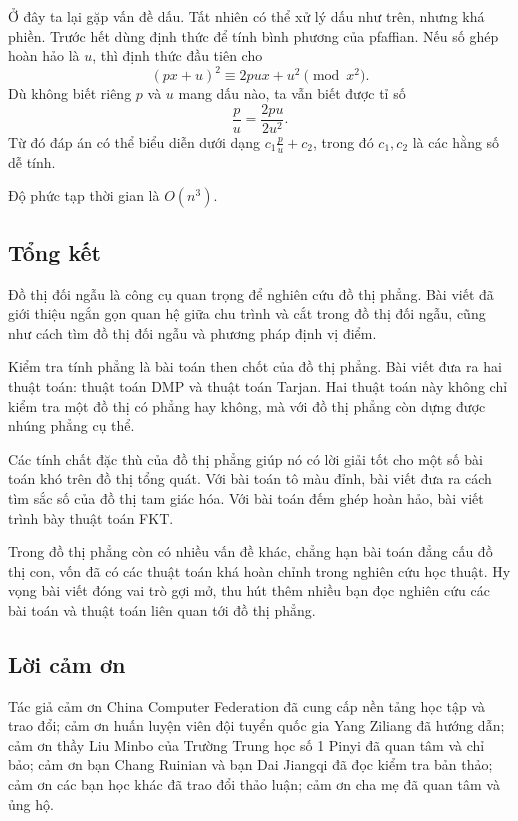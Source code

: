 \documentclass[11pt]{article}
\begin{document}
Ở đây ta lại gặp vấn đề dấu. Tất nhiên có thể xử lý dấu như trên, nhưng khá
phiền. Trước hết dùng định thức để tính bình phương của pfaffian. Nếu số ghép
hoàn hảo là $u$, thì định thức đầu tiên cho
\[
  (px+u)^2 \equiv 2pux+u^2 \pmod{x^2}.
\]
Dù không biết riêng $p$ và $u$ mang dấu nào, ta vẫn biết được tỉ số
\[
  \frac{p}{u}=\frac{2pu}{2u^2}.
\]
Từ đó đáp án có thể biểu diễn dưới dạng $c_1\frac{p}{u}+c_2$, trong đó
$c_1,c_2$ là các hằng số dễ tính.

Độ phức tạp thời gian là $O(n^3)$.

\subsection{Tổng kết}

Đồ thị đối ngẫu là công cụ quan trọng để nghiên cứu đồ thị phẳng. Bài viết đã
giới thiệu ngắn gọn quan hệ giữa chu trình và cắt trong đồ thị đối ngẫu, cũng
như cách tìm đồ thị đối ngẫu và phương pháp định vị điểm.

Kiểm tra tính phẳng là bài toán then chốt của đồ thị phẳng. Bài viết đưa ra
hai thuật toán: thuật toán DMP và thuật toán Tarjan. Hai thuật toán này không
chỉ kiểm tra một đồ thị có phẳng hay không, mà với đồ thị phẳng còn dựng được
nhúng phẳng cụ thể.

Các tính chất đặc thù của đồ thị phẳng giúp nó có lời giải tốt cho một số bài
toán khó trên đồ thị tổng quát. Với bài toán tô màu đỉnh, bài viết đưa ra cách
tìm sắc số của đồ thị tam giác hóa. Với bài toán đếm ghép hoàn hảo, bài viết
trình bày thuật toán FKT.

Trong đồ thị phẳng còn có nhiều vấn đề khác, chẳng hạn bài toán đẳng cấu đồ thị
con, vốn đã có các thuật toán khá hoàn chỉnh trong nghiên cứu học thuật. Hy
vọng bài viết đóng vai trò gợi mở, thu hút thêm nhiều bạn đọc nghiên cứu các
bài toán và thuật toán liên quan tới đồ thị phẳng.

\subsection*{Lời cảm ơn}

Tác giả cảm ơn China Computer Federation đã cung cấp nền tảng học tập và trao
đổi; cảm ơn huấn luyện viên đội tuyển quốc gia Yang Ziliang đã hướng dẫn; cảm
ơn thầy Liu Minbo của Trường Trung học số 1 Pinyi đã quan tâm và chỉ bảo; cảm
ơn bạn Chang Ruinian và bạn Dai Jiangqi đã đọc kiểm tra bản thảo; cảm ơn các
bạn học khác đã trao đổi thảo luận; cảm ơn cha mẹ đã quan tâm và ủng hộ.
\end{document}
